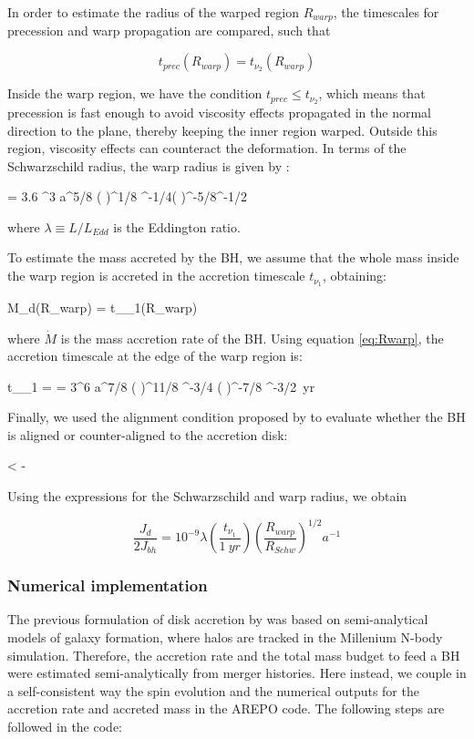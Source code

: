 \documentclass[a4,useAMS,usenatbib,usegraphicx,12pt]{article}
\begin{document}
In order to estimate the radius of the warped region $R_{warp}$, the timescales for precession and
warp propagation are compared, such that

\[ t_{prec}(R_{warp}) = t_{\nu_2}(R_{warp}) \]

Inside the warp region, we have the condition $t_{prec}\leq t_{\nu_2}$, which means that precession 
is fast enough to avoid viscosity effects propagated in the normal direction to the plane, thereby
keeping the inner region warped. Outside this region, viscosity effects can counteract the deformation.
In terms of the Schwarzschild radius, the warp radius is given by \citep{Volonteri2007}:

{  = 3.6 ^3 a^{5/8} \left(  \right)^{1/8}
\lambda^{-1/4}\left(  \right)^{-5/8}\alpha^{-1/2} }

where $\lambda \equiv L/L_{Edd}$ is the Eddington ratio.

To estimate the mass accreted by the BH, we assume that the whole mass inside the warp region is 
accreted in the accretion timescale $t_{\nu_1}$, obtaining:

{ M_d(R_{warp}) =  t_{\nu_1}(R_{warp}) }

where $\dot{M}$ is the mass accretion rate of the BH. Using equation \ref{eq:Rwarp}, the accretion 
timescale at the edge of the warp region is:

{ t_{\nu_1} =  = 3^6 a^{7/8} \left(  \right)^{11/8}
\lambda^{-3/4} \left(  \right)^{-7/8} \alpha^{-3/2}\ yr  }

Finally, we used the alignment condition proposed by \citet{King2005} to evaluate whether the BH is 
aligned or counter-aligned to the accretion disk:

{ \cos \theta < - }

Using the expressions for the Schwarzschild and warp radius, we obtain

\[ \frac{J_d}{2J_{bh}} = 10^{-9} \lambda \left( \frac{t_{\nu_1}}{1\ yr} \right) \left( \frac{R_{warp}}{R_{Schw}} \right)^{1/2}
a^{-1}\]

\subsubsection{Numerical implementation}

The previous formulation of disk accretion by \citet{Fanidakis2011} was based on semi-analytical 
models of galaxy formation, where halos are tracked in the Millenium N-body simulation. Therefore, 
the accretion rate and the total mass budget to feed a BH were estimated semi-analytically from
merger histories. Here instead, we couple in a self-consistent way the spin evolution and the 
numerical outputs for the accretion rate and accreted mass in the AREPO code. The following steps
are followed in the code:
\end{document}
